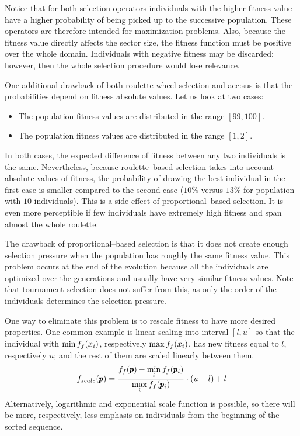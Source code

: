 Notice that for both selection operators individuals with the higher fitness value have a higher probability of being picked up to the successive population. These operators are therefore intended for maximization problems. Also, because the fitness value directly affects the sector size, the fitness function must be positive over the whole domain. Individuals with negative fitness may be discarded; however, then the whole selection procedure would lose relevance.

One additional drawback of both roulette wheel selection and \acrshort{acc:sus} is that the probabilities depend on fitness absolute values. Let us look at two cases:
\begin{itemize}
    \item The population fitness values are distributed in the range $\left[ 99,100 \right]$.
    \item The population fitness values are distributed in the range $\left[ 1, 2\right]$.
\end{itemize}
In both cases, the expected difference of fitness between any two individuals is the same. Nevertheless, because roulette--based selection takes into account absolute values of fitness, the probability of drawing the best individual in the first case is smaller compared to the second case ($10\%$ versus $13\%$ for population with $10$ individuals). This is a side effect of proportional--based selection. It is even more perceptible if few individuals have extremely  high fitness and span almost the whole roulette.

The drawback of proportional--based selection is that it does not create enough selection pressure when the population has roughly the same fitness value. This problem occurs at the end of the evolution because all the individuals are optimized over the generations and usually have very similar fitness values. Note that tournament selection does not suffer from this, as only the order of the individuals determines the selection pressure.

One way to eliminate this problem is to rescale fitness to have more desired properties. One common example is linear scaling into interval $\left[ l,u \right]$ so that the individual with $\min f_f(x_i)$, respectively $\max f_f(x_i)$, has new fitness equal to $l$, respectively $u$; and the rest of them are scaled linearly between them. 
$$
f_{scale}(\pmb{p})=\frac{f_f(\pmb{p}) - \min\limits_{i}f_f(\pmb{p}_i)}{\max\limits_{i}f_f(\pmb{p}_i)}\cdot(u-l)+l 
$$
Alternatively, logarithmic and exponential scale function is possible, so there will be more, respectively, less emphasis on individuals from the beginning of the sorted sequence.

